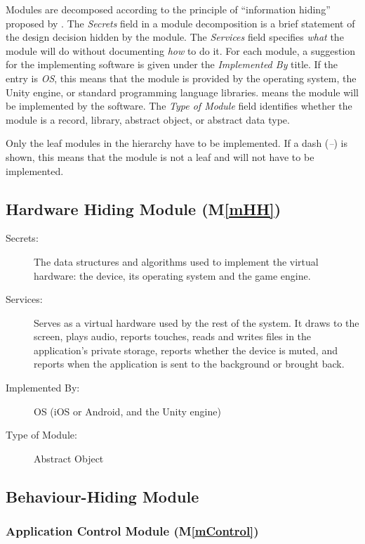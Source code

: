 \documentclass[10pt, titlepage]{article}
\newcommand{\mplainref}[1]{M\ref*{#1}}
\begin{document}
Modules are decomposed according to the principle of ``information hiding''
proposed by \cite{ParnasEtAl1984}. The \emph{Secrets} field in a module
decomposition is a brief statement of the design decision hidden by the
module. The \emph{Services} field specifies \emph{what} the module will do
without documenting \emph{how} to do it. For each module, a suggestion for the
implementing software is given under the \emph{Implemented By} title. If the
entry is \emph{OS}, this means that the module is provided by the operating
system, the Unity engine, or standard programming language libraries.
\emph{\progname{}} means the module will be implemented by the
\progname{} software. The \emph{Type of Module} field identifies whether
the module is a record, library, abstract object, or abstract data type.

Only the leaf modules in the hierarchy have to be implemented. If a dash
(\emph{--}) is shown, this means that the module is not a leaf and will not have
to be implemented.

\subsection{Hardware Hiding Module (\mplainref{mHH})}\label{md:mHH}

\begin{description}
\item[Secrets:] The data structures and algorithms used to implement the
  virtual hardware: the device, its operating system and the game engine.
\item[Services:] Serves as a virtual hardware used by the rest of the
  system. It draws to the screen, plays audio, reports touches, reads and writes
  files in the application's private storage, reports whether the device is
  muted, and reports when the application is sent to the background or
  brought back.
\item[Implemented By:] OS (iOS or Android, and the Unity engine)
\item[Type of Module:] Abstract Object
\end{description}

\subsection{Behaviour-Hiding Module}

\subsubsection{Application Control Module (\mplainref{mControl})}\label{md:mControl}
\end{document}
